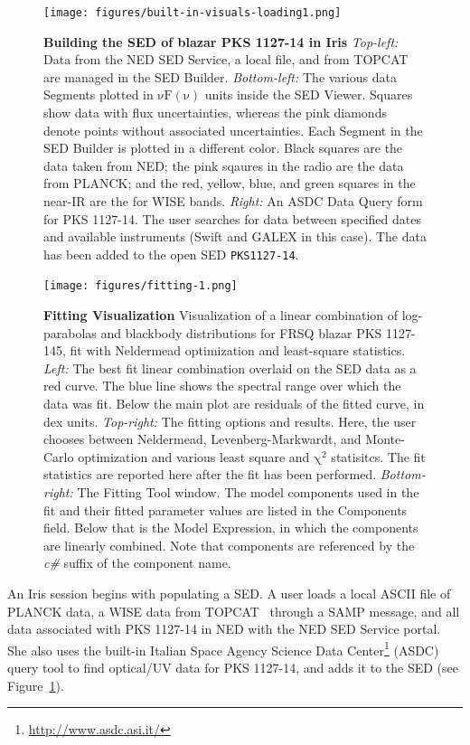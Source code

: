 \documentclass[final,5p]{elsarticle}
\begin{document}
\begin{figure}
\centering
\texttt{[image: figures/built-in-visuals-loading1.png]}
\caption{\textbf{Building the SED of blazar PKS 1127-14 in Iris} \textit{Top-left:} Data from the NED SED Service, a local file, and from TOPCAT are managed in the SED Builder. \textit{Bottom-left:} The various data Segments plotted in $\mathrm{\nu F \left( \nu \right)}$ units inside the SED Viewer. Squares show data with flux uncertainties, whereas the pink diamonds denote points without associated uncertainties. Each Segment in the SED Builder is plotted in a different color. Black squares are the data taken from NED; the pink sqaures in the radio are the data from PLANCK; and the red, yellow, blue, and green squares in the near-IR are the for WISE bands. \textit{Right:} An ASDC Data Query form for PKS 1127-14. The user searches for data between specified dates and available instruments (Swift and GALEX in this case). The data has been added to the open SED \texttt{PKS1127-14}.}
\label{fig:load_data}
\end{figure}

\begin{figure}
\centering
\texttt{[image: figures/fitting-1.png]}
\caption{\textbf{Fitting Visualization} Visualization of a linear combination of log-parabolas and blackbody distributions for FRSQ blazar PKS 1127-145, fit with Neldermead optimization and least-square statistics. \textit{Left:} The best fit linear combination overlaid on the SED data as a red curve. The blue line shows the spectral range over which the data was fit. Below the main plot are residuals of the fitted curve, in dex units. \textit{Top-right:} The fitting options and results. Here, the user chooses between Neldermead, Levenberg-Markwardt, and Monte-Carlo optimization and various least square and $\mathrm{\chi}^{2}$ statisitcs. The fit statistics are reported here after the fit has been performed. \textit{Bottom-right:} The Fitting Tool window. The model components used in the fit and their fitted parameter values are listed in the Components field. Below that is the Model Expression, in which the components are linearly combined. Note that components are referenced by the \textit{c\#} suffix of the component name.}
\label{fig:fitting1}
\end{figure}

An Iris session begins with populating a SED. A user loads a local ASCII file of PLANCK data, a WISE data from TOPCAT~\citep{2005ASPC..347...29T} through a SAMP message, and all data associated with PKS 1127-14 in NED with the NED SED Service portal. She also uses the built-in Italian Space Agency Science Data Center\footnote{\url{http://www.asdc.asi.it/}} (ASDC) query tool to find optical/UV data for PKS 1127-14, and adds it to the SED (see Figure~\ref{fig:load_data}).
\end{document}
